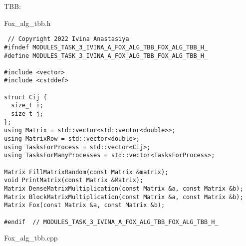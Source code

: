 \documentclass{report}
\begin{document}
 TBB:
 \par Fox\_alg\_tbb.h
 \begin{lstlisting}
 // Copyright 2022 Ivina Anastasiya
#ifndef MODULES_TASK_3_IVINA_A_FOX_ALG_TBB_FOX_ALG_TBB_H_
#define MODULES_TASK_3_IVINA_A_FOX_ALG_TBB_FOX_ALG_TBB_H_

#include <vector>
#include <cstddef>

struct Cij {
  size_t i;
  size_t j;
};
using Matrix = std::vector<std::vector<double>>;
using MatrixRow = std::vector<double>;
using TasksForProcess = std::vector<Cij>;
using TasksForManyProcesses = std::vector<TasksForProcess>;

Matrix FillMatrixRandom(const Matrix &matrix);
void PrintMatrix(const Matrix &Matrix);
Matrix DenseMatrixMultiplication(const Matrix &a, const Matrix &b);
Matrix BlockMatrixMultiplication(const Matrix &a, const Matrix &b);
Matrix Fox(const Matrix &a, const Matrix &b);

#endif  // MODULES_TASK_3_IVINA_A_FOX_ALG_TBB_FOX_ALG_TBB_H_
 \end{lstlisting}
  Fox\_alg\_tbb.cpp
\end{document}
